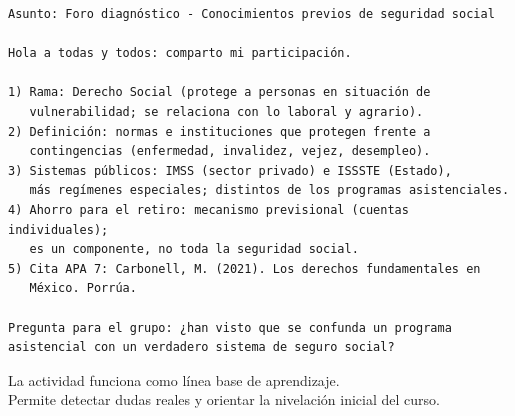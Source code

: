 \documentclass[spanish]{article}
\newcommand{\ContentSlide}[2]{%
  \clearpage
  \thispagestyle{empty}
  \noindent\begin{minipage}[t][10.55cm][t]{\paperwidth}
    \noindent\colorbox{unadmGreenDark}{%
      \begin{minipage}[c][1.18cm][c]{\paperwidth}
        \hspace*{0.65cm}{\color{white}\Large\bfseries #1}
      \end{minipage}%
    }
    \vspace{0.55cm}

    \hspace*{0.8cm}\begin{minipage}{17.55cm}
      \Large\color{unadmInk}#2
    \end{minipage}
    \vfill
    \noindent\colorbox{unadmGreen}{%
      \begin{minipage}[c][0.56cm][c]{\paperwidth}
        \hspace*{0.65cm}{\color{white}\small Derecho a la Seguridad Social - UnADM - \today}
      \end{minipage}%
    }
  \end{minipage}
}
\begin{document}
\clearpage
\thispagestyle{empty}
\noindent\begin{minipage}[t][10.55cm][t]{\paperwidth}
  \noindent\colorbox{unadmGreenDark}{%
    \begin{minipage}[c][1.18cm][c]{\paperwidth}
    \end{minipage}%
  }
  \vspace{0.35cm}

  \hspace*{0.8cm}\begin{minipage}{17.55cm}
    \begin{lstlisting}[style=foroplano]
Asunto: Foro diagnóstico - Conocimientos previos de seguridad social

Hola a todas y todos: comparto mi participación.

1) Rama: Derecho Social (protege a personas en situación de
   vulnerabilidad; se relaciona con lo laboral y agrario).
2) Definición: normas e instituciones que protegen frente a
   contingencias (enfermedad, invalidez, vejez, desempleo).
3) Sistemas públicos: IMSS (sector privado) e ISSSTE (Estado),
   más regímenes especiales; distintos de los programas asistenciales.
4) Ahorro para el retiro: mecanismo previsional (cuentas individuales);
   es un componente, no toda la seguridad social.
5) Cita APA 7: Carbonell, M. (2021). Los derechos fundamentales en
   México. Porrúa.

Pregunta para el grupo: ¿han visto que se confunda un programa
asistencial con un verdadero sistema de seguro social?
    \end{lstlisting}
  \end{minipage}
  \vfill
  \noindent\colorbox{unadmGreen}{%
    \begin{minipage}[c][0.56cm][c]{\paperwidth}
    \end{minipage}%
  }
\end{minipage}

\ContentSlide{Cierre}{
  \centering\vspace*{1.35cm}
  La actividad funciona como línea base de aprendizaje.\\[0.35cm]
  Permite detectar dudas reales y orientar la nivelación inicial del curso.
}
\end{document}
